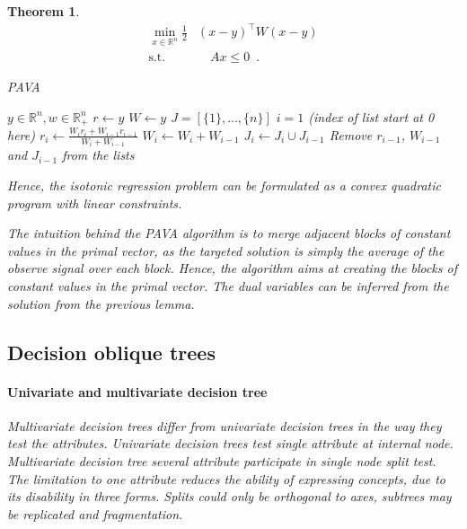 \documentclass[12pt,preprint]{elsarticle}
\newtheorem{Theorem}{Theorem}
\begin{document}
\begin{Theorem}
\begin{align}
\min_{x \in \mathbb{R}^n}
\frac{1}{2}
& (x-y)^\top W (x-y) \\
\text{s.t.} & \quad Ax \leq 0 \enspace.
\end{align}

\begin{algorithm}[ht]
\caption{PAVA}\label{alg:cap}
\begin{algorithmic}
\Require $y \in\mathbb{R}^n, w \in \mathbb{R}^n_{+}$
\STATE $r \leftarrow y$
\STATE $W \leftarrow y$
\STATE $J = [\{1\},\dots, \{n\}]$ 
\STATE $i=1$ (index of list start at 0 here)
     
        \State $r_i \leftarrow \frac{W_i r_i + W_{i-1} r_{i-1}}{W_i + W_{i-1}}$
        \State $W_i \leftarrow W_i + W_{i-1}$
        \State $J_i \leftarrow J_i \cup J_{i-1}$
        \State Remove $r_{i-1}$, $W_{i-1}$ and $J_{i-1}$ from the lists
        \ENDIF
    \ELSE
    \ENDIF
\ENDWHILE
{}
\ENDFOR
{}
\end{algorithmic}
\end{algorithm}

Hence, the isotonic regression problem can be formulated as a convex quadratic program with linear constraints.

The intuition behind the PAVA algorithm is to merge adjacent blocks of constant values in the primal vector, as the targeted solution is simply the average of the observe signal over each block.
Hence, the algorithm aims at creating the blocks of constant values in the primal vector. The dual variables can be inferred from the  solution from the previous lemma.

\subsection{Decision oblique trees}

\paragraph{Univariate and multivariate decision tree}
Multivariate  decision  trees  differ  from  univariate  decision trees in the way they  test the  attributes.   Univariate decision trees  test  single  attribute  at  internal  node.  Multivariate decision tree several attribute participate in single node split test.    The  limitation  to  one  attribute  reduces the  ability  of expressing concepts, due to its disability in three forms.  Splits could only be orthogonal to axes, subtrees may be replicated and fragmentation. 


\end{Theorem}
\end{document}
